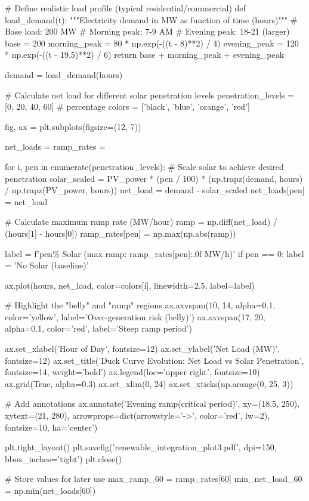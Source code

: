 \documentclass[11pt,a4paper]{article}
\begin{document}
\begin{pycode}
# Define realistic load profile (typical residential/commercial)
def load_demand(t):
    """Electricity demand in MW as function of time (hours)"""
    # Base load: 200 MW
    # Morning peak: 7-9 AM
    # Evening peak: 18-21 (larger)
    base = 200
    morning_peak = 80 * np.exp(-((t - 8)**2) / 4)
    evening_peak = 120 * np.exp(-((t - 19.5)**2) / 6)
    return base + morning_peak + evening_peak

demand = load_demand(hours)

# Calculate net load for different solar penetration levels
penetration_levels = [0, 20, 40, 60]  # percentage
colors = ['black', 'blue', 'orange', 'red']

fig, ax = plt.subplots(figsize=(12, 7))

net_loads = {}
ramp_rates = {}

for i, pen in enumerate(penetration_levels):
    # Scale solar to achieve desired penetration
    solar_scaled = PV_power * (pen / 100) * (np.trapz(demand, hours) /
                                              np.trapz(PV_power, hours))
    net_load = demand - solar_scaled
    net_loads[pen] = net_load

    # Calculate maximum ramp rate (MW/hour)
    ramp = np.diff(net_load) / (hours[1] - hours[0])
    ramp_rates[pen] = np.max(np.abs(ramp))

    label = f'{pen}\% Solar (max ramp: {ramp_rates[pen]:.0f} MW/h)'
    if pen == 0:
        label = 'No Solar (baseline)'

    ax.plot(hours, net_load, color=colors[i], linewidth=2.5, label=label)

# Highlight the "belly" and "ramp" regions
ax.axvspan(10, 14, alpha=0.1, color='yellow', label='Over-generation risk (belly)')
ax.axvspan(17, 20, alpha=0.1, color='red', label='Steep ramp period')

ax.set_xlabel('Hour of Day', fontsize=12)
ax.set_ylabel('Net Load (MW)', fontsize=12)
ax.set_title('Duck Curve Evolution: Net Load vs Solar Penetration', fontsize=14, weight='bold')
ax.legend(loc='upper right', fontsize=10)
ax.grid(True, alpha=0.3)
ax.set_xlim(0, 24)
ax.set_xticks(np.arange(0, 25, 3))

# Add annotations
ax.annotate('Evening ramp\n(critical period)', xy=(18.5, 250), xytext=(21, 280),
            arrowprops=dict(arrowstyle='->', color='red', lw=2),
            fontsize=10, ha='center')

plt.tight_layout()
plt.savefig('renewable_integration_plot3.pdf', dpi=150, bbox_inches='tight')
plt.close()

# Store values for later use
max_ramp_60 = ramp_rates[60]
min_net_load_60 = np.min(net_loads[60])
\end{pycode}
\end{document}
